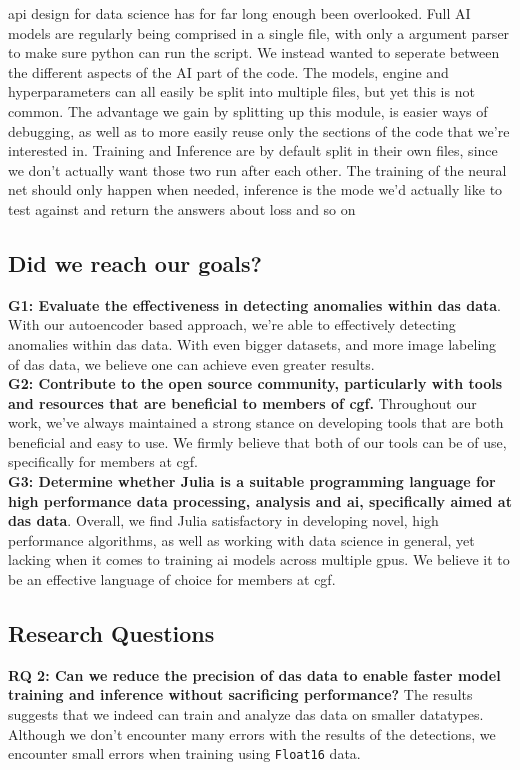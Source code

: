 api design for data science has for far long enough been overlooked. Full AI models are regularly being comprised in a single file, with only a argument parser to make sure python can run the script. We instead wanted to seperate between the different aspects of the AI part of the code. The models, engine and hyperparameters can all easily be split into multiple files, but yet this is not common. The advantage we gain by splitting up this module, is easier ways of debugging, as well as to more easily reuse only the sections of the code that we're interested in. Training and Inference are by default split in their own files, since we don't actually want those two run after each other. The training of the neural net should only happen when needed, inference is the mode we'd actually like to test against and return the answers about loss and so on 


\subsection{Did we reach our goals?}


\textbf{G1: Evaluate the effectiveness in detecting anomalies within \acrshort{das} data}. With our autoencoder based approach, we're able to effectively detecting anomalies within \acrshort{das} data. With even bigger datasets, and more image labeling of \acrshort{das} data, we believe one can achieve even greater results. \\

\textbf{G2: Contribute to the open source community, particularly with tools and resources that are beneficial to members of \acrshort{cgf}.} Throughout our work, we've always maintained a strong stance on developing tools that are both beneficial and easy to use. We firmly believe that both of our tools can be of use, specifically for members at \acrshort{cgf}.  \\ 

\textbf{G3: Determine whether Julia is a suitable programming language for 
 high performance data processing, analysis and \acrshort{ai}, specifically aimed at \acrshort{das} data}. Overall, we find Julia satisfactory in developing novel, high performance algorithms, as well as working with data science in general, yet lacking when it comes to training \acrshort{ai} models across multiple \acrshort{gpu}s. We believe it to be an effective language of choice for members at \acrshort{cgf}.\\


\subsection{Research Questions}

\textbf{RQ 2: Can we reduce the precision of \acrshort{das} data to enable faster model training and inference without sacrificing performance?} The results suggests that we indeed can train and analyze \acrshort{das} data on smaller datatypes. Although we don't encounter many errors with the results of the detections, we encounter small errors when training using \texttt{Float16} data. \\
